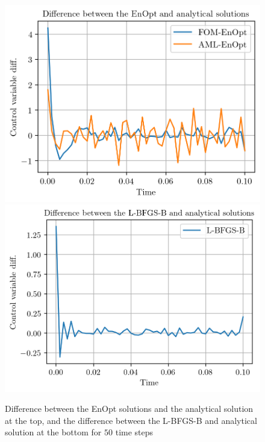 \begin{figure}
\centering
\includegraphics{Plots/solutionsDifferNT50.png}
\includegraphics{Plots/solutionsDifferLBFGSBAnalyticalNT50.png}
\caption{\label{solutionsDifferNT50}Difference between the EnOpt solutions and the analytical solution at the top, and the difference between the L-BFGS-B and analytical solution at the bottom for $50$ time steps}
\end{figure}

